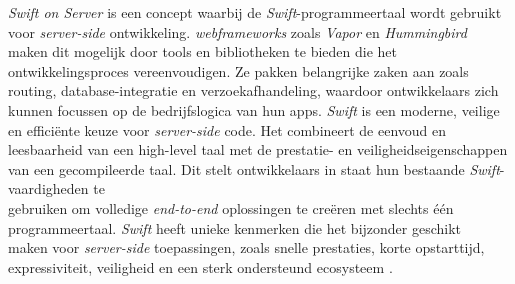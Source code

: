 \textit{Swift on Server} is een concept waarbij de \textit{Swift}-programmeertaal wordt gebruikt voor \textit{server-side} ontwikkeling. \textit{webframeworks} zoals \textit{Vapor} en \textit{Hummingbird} \\maken dit mogelijk door tools en bibliotheken te bieden die het ontwikkelingsproces vereenvoudigen. Ze pakken belangrijke zaken aan zoals routing, database-integratie en verzoekafhandeling, waardoor ontwikkelaars zich kunnen focussen op de bedrijfslogica van hun apps.
\textit{Swift} is een moderne, veilige en efficiënte keuze voor \textit{server-side} code. Het combineert de eenvoud en leesbaarheid van een high-level taal met de prestatie- en veiligheidseigenschappen van een gecompileerde taal. Dit stelt ontwikkelaars in staat hun bestaande \textit{Swift}-vaardigheden te \\gebruiken om volledige \textit{end-to-end} oplossingen te creëren met slechts één \\programmeertaal. \textit{Swift} heeft unieke kenmerken die het bijzonder geschikt \\maken voor \textit{server-side} toepassingen, zoals snelle prestaties, korte opstarttijd, \\expressiviteit, veiligheid en een sterk ondersteund ecosysteem \autocite{2022}.  \\


